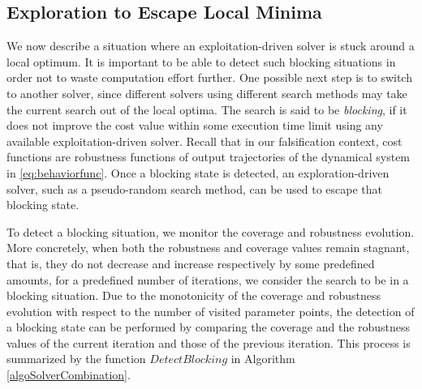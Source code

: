 
\subsection{Exploration to Escape Local Minima}
We now describe a situation where an exploitation-driven solver is stuck around a local optimum. It is important to be able to detect such blocking situations in order not to waste computation effort further. One possible next step is to switch to another solver, since different solvers using different search methods may take the current search out of the local optima. The search is said to be {\em blocking}, if it does not improve the cost value within some execution time limit using any available exploitation-driven solver. Recall that in our falsification context, cost functions are robustness functions of output trajectories of the dynamical system in \ref{eq:behaviorfunc}. Once a blocking state is detected, an exploration-driven solver, such as a pseudo-random search method, can be used to escape that blocking state. 

To detect a blocking situation, we monitor the coverage and robustness evolution. More concretely, when both the robustness and coverage values remain stagnant, that is, they do not decrease and increase respectively by some predefined amounts, for a predefined number of iterations, we consider the search to be in a blocking situation. Due to the monotonicity of the coverage and robustness evolution with respect to the number of visited parameter points, the detection of a blocking state can be performed by comparing the coverage and the robustness values of the current iteration and those of the previous iteration. This process is summarized by the function $DetectBlocking$ in Algorithm \ref{algoSolverCombination}.

